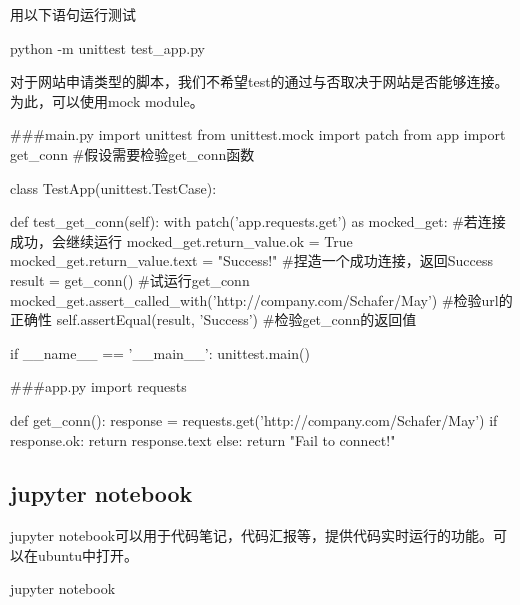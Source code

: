     用以下语句运行测试
    \begin{codeblock}[language=bash, caption={run unittest}]
      python -m unittest test_app.py
    \end{codeblock}

    对于网站申请类型的脚本，我们不希望test的通过与否取决于网站是否能够连接。
    为此，可以使用mock module。
    \begin{codeblock}[language=python, caption={mock module}]
      #\#\#main.py
      import unittest
      from unittest.mock import patch
      from app import get_conn #假设需要检验get\_conn函数

      class TestApp(unittest.TestCase):
        
          def test_get_conn(self):
              with patch('app.requests.get') as mocked_get: #若连接成功，会继续运行
                  mocked_get.return_value.ok = True
                  mocked_get.return_value.text = "Success!" #捏造一个成功连接，返回Success
                  result = get_conn() #试运行get\_conn
                  mocked_get.assert_called_with('http://company.com/Schafer/May') #检验url的正确性
                  self.assertEqual(result, 'Success') #检验get\_conn的返回值

      if __name__ == '__main__':
          unittest.main()

      #\#\#app.py
      import requests

      def get_conn():
          response = requests.get('http://company.com/Schafer/May')
          if response.ok:
              return response.text
          else:
              return "Fail to connect!"
    \end{codeblock}

  \subsection{jupyter notebook}
    jupyter notebook可以用于代码笔记，代码汇报等，提供代码实时运行的功能。可以在ubuntu中打开。
    \begin{codeblock}[language=bash, caption={run jupyter notebok}]
      jupyter notebook
    \end{codeblock}
